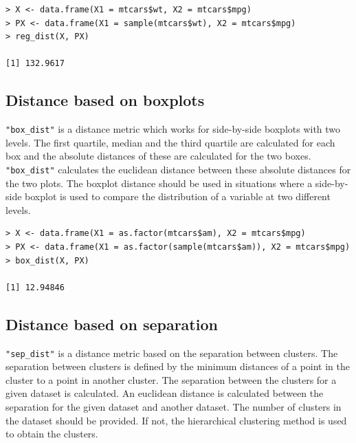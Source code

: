 \documentclass[article]{jss}
\begin{document}
\begin{verbatim}
> X <- data.frame(X1 = mtcars$wt, X2 = mtcars$mpg)
> PX <- data.frame(X1 = sample(mtcars$wt), X2 = mtcars$mpg)
> reg_dist(X, PX)

[1] 132.9617
\end{verbatim}

\subsection{Distance based on
boxplots}\label{distance-based-on-boxplots}

\texttt{"box\_dist"} is a distance metric which works for side-by-side
boxplots with two levels. The first quartile, median and the third
quartile are calculated for each box and the absolute distances of these
are calculated for the two boxes. \texttt{"box\_dist"} calculates the
euclidean distance between these absolute distances for the two plots.
The boxplot distance should be used in situations where a side-by-side
boxplot is used to compare the distribution of a variable at two
different levels.

%

\begin{verbatim}
> X <- data.frame(X1 = as.factor(mtcars$am), X2 = mtcars$mpg)
> PX <- data.frame(X1 = as.factor(sample(mtcars$am)), X2 = mtcars$mpg)
> box_dist(X, PX)

[1] 12.94846
\end{verbatim}

\subsection{Distance based on
separation}\label{distance-based-on-separation}

\texttt{"sep\_dist"} is a distance metric based on the separation
between clusters. The separation between clusters is defined by the
minimum distances of a point in the cluster to a point in another
cluster. The separation between the clusters for a given dataset is
calculated. An euclidean distance is calculated between the separation
for the given dataset and another dataset. The number of clusters in the
dataset should be provided. If not, the hierarchical clustering method
is used to obtain the clusters.
\end{document}
